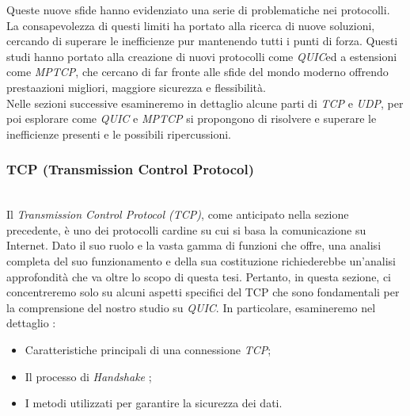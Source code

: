 Queste nuove sfide hanno evidenziato una serie di problematiche nei protocolli. La consapevolezza di questi limiti ha portato alla ricerca di nuove soluzioni, cercando di superare le inefficienze pur mantenendo tutti i punti di forza.
Questi studi hanno portato alla creazione di nuovi protocolli come \emph{QUIC}\glsfirstoccur ed a estensioni come \emph{MPTCP}\glsfirstoccur, che cercano di far fronte alle sfide del mondo moderno offrendo prestaazioni migliori, maggiore sicurezza e flessibilità.
\\
Nelle sezioni successive esamineremo in dettaglio alcune parti di \emph{TCP} e \emph{UDP}, per poi esplorare come \emph{QUIC} e \emph{MPTCP} si propongono di risolvere e superare le inefficienze presenti e le possibili ripercussioni.

\subsubsection{TCP (Transmission Control Protocol)}

~\\
\indent Il \emph{Transmission Control Protocol (TCP)}, come anticipato nella sezione precedente, è uno dei protocolli cardine su cui si basa la comunicazione su Internet. Dato il suo ruolo e la vasta gamma di funzioni che offre, una analisi completa del suo funzionamento e della sua costituzione richiederebbe un'analisi approfondità che va oltre lo scopo di questa tesi. Pertanto, in questa sezione, ci concentreremo solo su alcuni aspetti specifici del TCP che sono fondamentali per la comprensione del nostro studio su \emph{QUIC}. 
In particolare, esamineremo nel dettaglio :
\begin{itemize}
    \item Caratteristiche principali di una connessione \emph{TCP};
    
    \item Il processo di \emph{Handshake} \glsfirstoccur;
    
    \item I metodi utilizzati per garantire la sicurezza dei dati.
\end{itemize}

